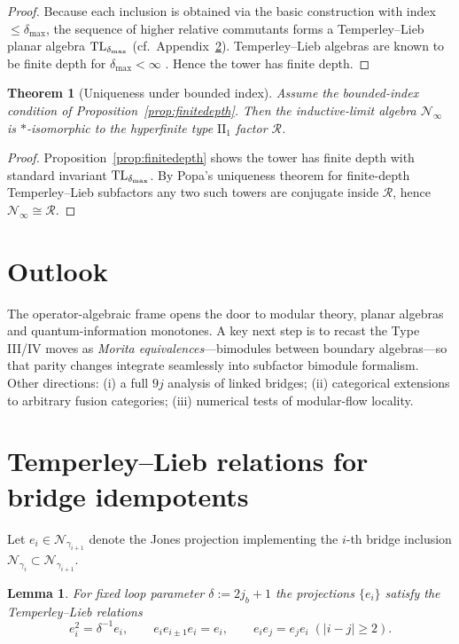\documentclass[11pt]{article}
\newtheorem{theorem}{Theorem}[section]
\newtheorem{lemma}{Lemma}[section]
\begin{document}
\begin{proof}
Because each inclusion is obtained via the basic construction with
index $\le\delta_{\max}$, the sequence of higher relative commutants
forms a Temperley--Lieb planar algebra ${\rm TL}_{\delta_{\max}}$
(cf.\ Appendix~\ref{app:TL}).  
Temperley--Lieb algebras are known to be finite depth for 
$\delta_{\max}\!<\!\infty$ \cite[Prop.~2.2]{JonesTL}.  Hence the tower
has finite depth.
\end{proof}

\begin{theorem}[Uniqueness under bounded index]\label{thm:unique}
Assume the bounded-index condition of Proposition~\ref{prop:finitedepth}.
Then the inductive-limit algebra $\mathcal N_{\infty}$ is
$*$-isomorphic to the hyperfinite type $\mathrm{II}_1$ factor
$\mathcal R$.
\end{theorem}

\begin{proof}
Proposition~\ref{prop:finitedepth} shows the tower has finite depth with
standard invariant ${\rm TL}_{\delta_{\max}}$.
By Popa’s uniqueness theorem for finite-depth Temperley–Lieb
subfactors \cite{PopaCBMS} any two such towers are conjugate inside
$\mathcal R$, hence $\mathcal N_{\infty}\cong\mathcal R$.
\end{proof}

\section{Outlook}
The operator-algebraic frame opens the door to modular theory, planar
algebras and quantum-information monotones.  A key next step is to recast the
Type III/IV moves as \emph{Morita equivalences}—bimodules between boundary
algebras—so that parity changes integrate seamlessly into subfactor bimodule
formalism.  Other directions: (i) a full $9j$ analysis of linked bridges; (ii)
categorical extensions to arbitrary fusion categories; (iii) numerical tests of
modular-flow locality.

\appendix
\section{Temperley--Lieb relations for bridge idempotents}\label{app:TL}

Let $e_i\in\mathcal N_{\gamma_{i+1}}$ denote the Jones projection 
implementing the $i$-th bridge inclusion 
$\mathcal N_{\gamma_i}\subset\mathcal N_{\gamma_{i+1}}$.

\begin{lemma}
For fixed loop parameter $\delta := 2j_b+1$ the projections $\{e_i\}$
satisfy the Temperley--Lieb relations
\[
  e_i^2 = \delta^{-1} e_i,\qquad
  e_i e_{i\pm1} e_i = e_i,\qquad
  e_i e_j = e_j e_i\;( |i-j|\ge 2).
\]
\end{lemma}
\end{document}
